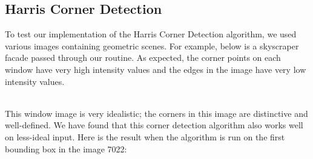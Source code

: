 \documentclass{article}
\begin{document}
\subsection{Harris Corner Detection}
To test our implementation of the Harris Corner Detection algorithm, we used various images containing geometric scenes.  For example, below is a skyscraper facade passed through our routine.  As expected, the corner points on each window have very high intensity values and the edges in the image have very low intensity values.
\begin{center}
\end{center}
~\\
This window image is very idealistic; the corners in this image are distinctive and well-defined.  We have found that this corner detection algorithm also works well on less-ideal input.  Here is the result when the algorithm is run on the first bounding box in the image 7022:
\end{document}
